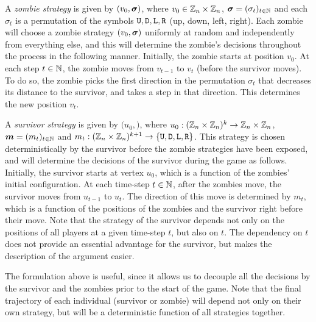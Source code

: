 \documentclass[12pt]{amsart}
\begin{document}
A \emph{zombie strategy} is given by $(v_0,{\boldsymbol\sigma})$, where $v_0 \in{\mathbb Z}_n\times{\mathbb Z}_n$, ${\boldsymbol\sigma} =(\sigma_t)_{t\in{\mathbb N}}$ and each $\sigma_t$ is a permutation of the symbols ${\mathtt U},{\mathtt D},{\mathtt L},{\mathtt R}$ (up, down,
left, right). Each zombie will choose a zombie strategy $(v_0,{\boldsymbol\sigma})$ uniformly at random and independently from everything else, and this will determine the zombie's decisions throughout the
process in the following manner. Initially, the zombie starts at position $v_0$. At each step $t\in{\mathbb N}$, the zombie moves from $v_{t-1}$ to $v_t$ (before the survivor moves). To do so, the zombie
picks the first direction in the permutation $\sigma_t$ that decreases its distance to the survivor, and takes a step in that direction. This determines the new position $v_t$.

A \emph{survivor strategy} is given by $(u_0,\bm)$, where $u_0: ({\mathbb Z}_n\times{\mathbb Z}_n)^k \to {\mathbb Z}_n\times{\mathbb Z}_n$, ${\boldsymbol m} = (m_t)_{t\in{\mathbb N}}$ and $m_t: ({\mathbb Z}_n\times{\mathbb Z}_n)^{k+1} \to \{{\mathtt U},{\mathtt D},{\mathtt L},{\mathtt R}\}$.  This strategy
is chosen deterministically by the survivor before the zombie strategies have been exposed, and will determine the decisions of the survivor during the game as follows. Initially, the survivor starts
at vertex $u_0$, which is a function of the zombies' initial configuration. At each time-step $t\in{\mathbb N}$, after the zombies move, the survivor moves from $u_{t-1}$ to $u_t$. The direction of this move
is determined by $m_t$, which is a function of the positions of the zombies and the survivor right before their move.
Note that the strategy of the survivor depends not only on the positions of all players at a given time-step $t$, but also on $t$.
The dependency on $t$ does not provide an essential advantage for the survivor, but makes the description of the argument easier.




The formulation above is useful, since it allows us to decouple all the decisions by the survivor and the zombies prior to the start of the game. Note that the final trajectory of each individual
(survivor or zombie) will depend not only on their own strategy, but will be a deterministic function of all strategies together.
\end{document}
